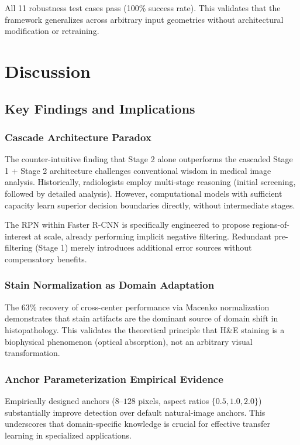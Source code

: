 \documentclass[journal]{IEEEtran}
\begin{document}
All 11 robustness test cases pass (100\% success rate). This validates that the framework generalizes across arbitrary input geometries without architectural modification or retraining.

\section{Discussion}

\subsection{Key Findings and Implications}

\subsubsection{Cascade Architecture Paradox}
The counter-intuitive finding that Stage 2 alone outperforms the cascaded Stage 1 + Stage 2 architecture challenges conventional wisdom in medical image analysis. Historically, radiologists employ multi-stage reasoning (initial screening, followed by detailed analysis). However, computational models with sufficient capacity learn superior decision boundaries directly, without intermediate stages.

The RPN within Faster R-CNN is specifically engineered to propose regions-of-interest at scale, already performing implicit negative filtering. Redundant pre-filtering (Stage 1) merely introduces additional error sources without compensatory benefits.

\subsubsection{Stain Normalization as Domain Adaptation}
The $63\%$ recovery of cross-center performance via Macenko normalization demonstrates that stain artifacts are the dominant source of domain shift in histopathology. This validates the theoretical principle that H\&E staining is a biophysical phenomenon (optical absorption), not an arbitrary visual transformation.

\subsubsection{Anchor Parameterization Empirical Evidence}
Empirically designed anchors ($8$--$128$ pixels, aspect ratios $\{0.5, 1.0, 2.0\}$) substantially improve detection over default natural-image anchors. This underscores that domain-specific knowledge is crucial for effective transfer learning in specialized applications.
\end{document}
